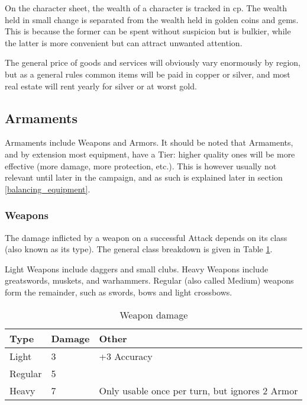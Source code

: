 On the character sheet, the wealth of a character is tracked in cp. The wealth held in small change is separated from the wealth held in golden coins and gems. This is because the former can be spent without suspicion but is bulkier, while the latter is more convenient but can attract unwanted attention.

The general price of goods and services will obviously vary enormously by region, but as a general rules common items will be paid in copper or silver, and most real estate will rent yearly for silver or at worst gold.

\subsection{Armaments}

Armaments include Weapons and Armors. It should be noted that Armaments, and by extension most equipment, have a Tier: higher quality ones will be more effective (more damage, more protection, etc.). This is however usually not relevant until later in the campaign, and as such is explained later in section \ref{balancing_equipment}.

\subsubsection{Weapons}

The damage inflicted by a weapon on a successful Attack depends on its class (also known as its type). The general class breakdown is given in Table \ref{weapon_damage}.

Light Weapons include daggers and small clubs. Heavy Weapons include greatswords, muskets, and warhammers. Regular (also called Medium) weapons form the remainder, such as swords, bows and light crossbows.

\begin{table}[h!tbp]
	\begin{center}
		\begin{tabular}{p{1.25cm}p{1.5cm}p{4cm}} \toprule

			\textbf{Type} & \textbf{Damage} & \textbf{Other} \\ \midrule

			Light & 3 & +3 Accuracy \\
			Regular & 5 & \\
			Heavy & 7 & Only usable once per turn, but ignores 2 Armor\\

			\bottomrule
		\end{tabular}
	\end{center}
	\caption{Weapon damage}
	\label{weapon_damage}
\end{table}

